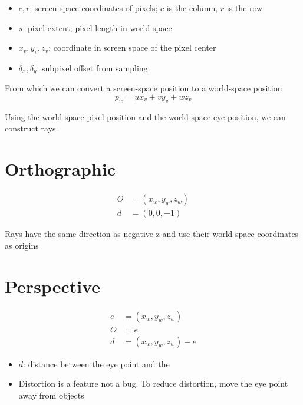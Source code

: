   \begin{itemize}
    \item $ c, r $: screen space coordinates of pixels; $ c $ is the column,
    $ r $ is the row
    \item $ s $: pixel extent; pixel length in world space
    \item $ x_{v}, y_{v}, z_{v} $: coordinate in screen space of the pixel center
    \item $ \delta_{x}, \delta_{y} $: subpixel offset from sampling
  \end{itemize}

  From which we can convert a screen-space position to a world-space position
  \begin{equation}
    p_{w} = u x_{v} + v y_{v} + w z_{v}
  \end{equation}

  Using the world-space pixel position and the world-space eye position,
  we can construct rays.

\section{Orthographic}

  \begin{align}
    O &= \left( x_{w}, y_{w}, z_{w} \right) \\
    d &= \left( 0, 0, -1 \right)
  \end{align}

  Rays have the same direction as negative-z and use their world space
  coordinates as origins

\section{Perspective}

  \begin{align}
    e &= \left( x_{w}, y_{w}, z_{w} \right) \\
    O &= e  \\
    d &= \left( x_{w}, y_{w}, z_{w} \right) - e
  \end{align}

  \begin{itemize}
    \item $ d $: distance between the eye point and the 
    \item Distortion is a feature not a bug. To reduce distortion, move
    the eye point away from objects
  \end{itemize}
